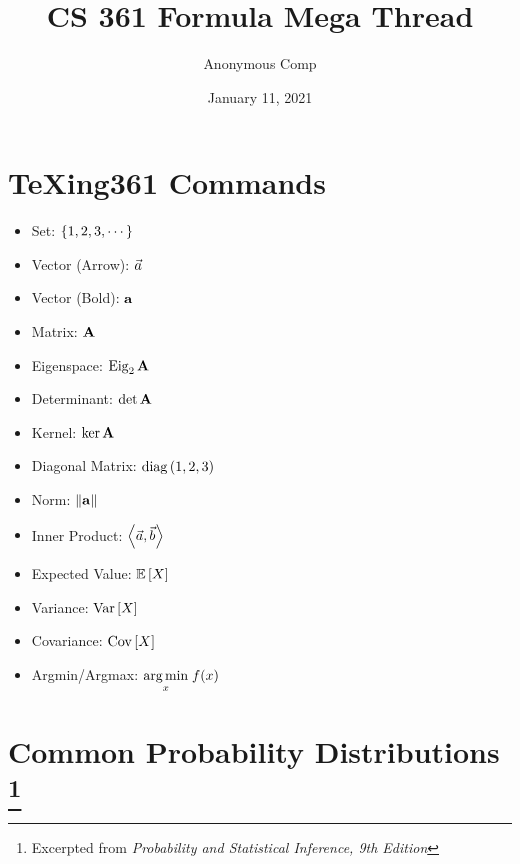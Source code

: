 \documentclass{article}
\title{CS 361 Formula Mega Thread}
\author{Anonymous Comp}
\date{January 11, 2021}
\begin{document}
\maketitle

\section{TeXing361 Commands}
\begin{itemize}
    \item Set: $\left\{1, 2, 3, \cdots\right\}$
    \item Vector (Arrow): $\vec{a}$
    \item Vector (Bold): $\mathbf{a}$
    \item Matrix: $\mathbf{A}$
    \item Eigenspace: $\operatorname{Eig}_{2}\mathbf{A}$
    \item Determinant: $\det\mathbf{A}$
    \item Kernel: $\ker\mathbf{A}$
    \item Diagonal Matrix: $\operatorname{diag}{(1, 2, 3)}$
    \item Norm: $\left\|\mathbf{a}\right\|$
    \item Inner Product: $\left\langle\vec{a},\vec{b}\right\rangle$
    \item Expected Value: $\mathbb{E}\left[X\right]$
    \item Variance: $\text{Var}\left[X\right]$
    \item Covariance: $\text{Cov}\left[X\right]$
    \item Argmin/Argmax: $\underset{x}{\text{arg\,min}}\; f(x)$
\end{itemize}

\newpage
\section{Common Probability Distributions \protect\footnote{Excerpted from \emph{Probability and Statistical Inference, 9th Edition}}}
\end{document}
